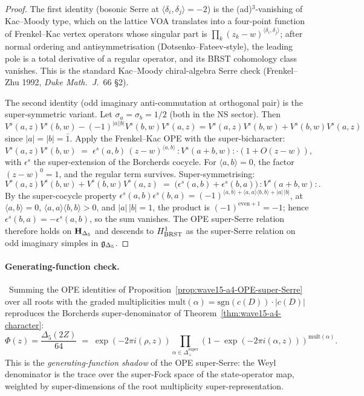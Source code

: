 \begin{proof}
The first identity (bosonic Serre at $\langle \delta_i, \delta_j \rangle
= -2$) is the (ad)$^{3}$-vanishing of Kac--Moody type, which on the
lattice VOA translates into a four-point function of Frenkel--Kac
vertex operators whose singular part is
$\prod_{k} (z_k - w)^{\langle \delta_i, \delta_j \rangle}$; after
normal ordering and antisymmetrisation (Dotsenko--Fateev-style),
the leading pole is a total derivative of a regular operator, and
its BRST cohomology class vanishes. This is the standard
Kac--Moody chiral-algebra Serre check (Frenkel--Zhu 1992,
\emph{Duke Math.\ J.}~66 \S2).

The second identity (odd imaginary anti-commutation at orthogonal
pair) is the super-symmetric variant. Let $\sigma_a = \sigma_b =
1/2$ (both in the NS sector). Then
$V^s(a, z) V^s(b, w) - (-1)^{|a| |b|} V^s(b, w) V^s(a, z) =
V^s(a, z) V^s(b, w) + V^s(b, w) V^s(a, z)$ since $|a| = |b| = \bar 1$.
Apply the Frenkel--Kac OPE with the super-bicharacter:
\[
  V^s(a, z) V^s(b, w)
  \;=\;
  \epsilon^s(a, b)\, (z - w)^{\langle a, b \rangle}\,
  {:}V^s(a + b, w){:}
  \cdot (1 + O(z - w)),
\]
with $\epsilon^s$ the super-extension of the Borcherds cocycle. For
$\langle a, b \rangle = 0$, the factor $(z - w)^0 = 1$, and the
regular term survives. Super-symmetrising:
\[
  V^s(a, z) V^s(b, w) + V^s(b, w) V^s(a, z)
  \;=\;
  \bigl(\epsilon^s(a, b) + \epsilon^s(b, a)\bigr)\,
  {:}V^s(a + b, w){:}.
\]
By the super-cocycle property
$\epsilon^s(a, b) \epsilon^s(b, a) = (-1)^{\langle a, b \rangle +
\langle a, a \rangle \langle b, b \rangle + |a|\,|b|}$,
at $\langle a, b \rangle = 0$, $\langle a, a \rangle \langle b, b
\rangle > 0$, and $|a| \, |b| = 1$, the product is
$(-1)^{\text{even} + 1} = -1$; hence $\epsilon^s(b, a) =
-\epsilon^s(a, b)$, so the sum vanishes. The OPE super-Serre
relation therefore holds on $\mathbf{H}_{\Delta_5}$ and descends to $H^1_{\mathrm{BRST}}$
as the super-Serre relation on odd imaginary simples in
$\mathfrak{g}_{\Delta_5}$.
\end{proof}

\paragraph{Generating-function check.}
\ClaimStatusProvedHere\
Summing the OPE identities of
Proposition~\ref{prop:wave15-a4-OPE-super-Serre} over all roots with
the graded multiplicities $\mathrm{mult}(\alpha) = \mathrm{sgn}(c(D))\cdot
|c(D)|$ reproduces the Borcherds super-denominator of
Theorem~\ref{thm:wave15-a4-character}:
\[
  \Phi(z) = \frac{\Delta_5(2 Z)}{64}
  \;=\;
  \exp(-2\pi i(\rho, z))
  \prod_{\alpha \in \Delta_+^{\mathrm{super}}}
  (1 - \exp(-2\pi i (\alpha, z)))^{\mathrm{mult}(\alpha)}.
\]
This is the \emph{generating-function shadow} of the OPE super-Serre:
the Weyl denominator is the trace over the super-Fock space of the
state-operator map, weighted by super-dimensions of the root
multiplicity super-representation.

